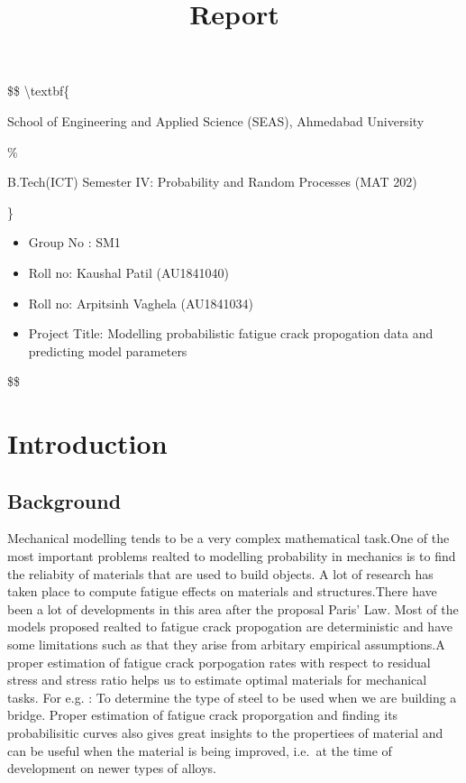 \documentclass[11pt]{article}
\title{Report}
\begin{document}
    
    \maketitle
    
    

    
    \$\$ \textbackslash{}textbf\{

\begin{center}
{
\large{School of Engineering and Applied Science (SEAS), Ahmedabad University}\vspace{4mm}
}
\end{center}

\%

\begin{center}
\large{B.Tech(ICT) Semester IV: Probability and Random Processes (MAT 202) }\\ \vspace{3mm}
\end{center}

\}

\begin{itemize}
\item Group No : SM1
\item Roll no: Kaushal Patil (AU1841040)
\item Roll no: Arpitsinh Vaghela (AU1841034)
\item Project Title: Modelling probabilistic fatigue crack propogation data and predicting model parameters

\end{itemize}

\$\$

\hypertarget{introduction}{%
\section{Introduction}\label{introduction}}

\hypertarget{background}{%
\subsection{Background}\label{background}}

Mechanical modelling tends to be a very complex mathematical task.One of
the most important problems realted to modelling probability in
mechanics is to find the reliabity of materials that are used to build
objects. A lot of research has taken place to compute fatigue effects on
materials and structures.There have been a lot of developments in this
area after the proposal Paris' Law. Most of the models proposed realted
to fatigue crack propogation are deterministic and have some limitations
such as that they arise from arbitary empirical assumptions.A proper
estimation of fatigue crack porpogation rates with respect to residual
stress and stress ratio helps us to estimate optimal materials for
mechanical tasks. For e.g. : To determine the type of steel to be used
when we are building a bridge. Proper estimation of fatigue crack
proporgation and finding its probabilisitic curves also gives great
insights to the propertiees of material and can be useful when the
material is being improved, i.e.~at the time of development on newer
types of alloys.
\end{document}
